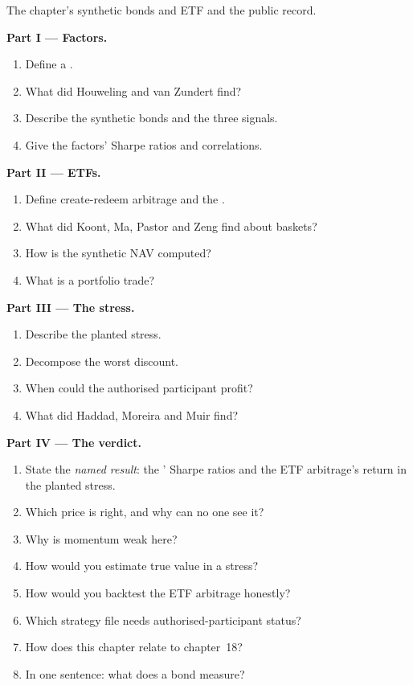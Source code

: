 \begin{problem}\label{pb:s2:systematic-credit-and-bond-etf-arbitrage:1}
The chapter's synthetic bonds and ETF and the public record.

\medskip\noindent\textbf{Part I --- Factors.}
\begin{enumerate}
\item Define a .
\item What did Houweling and van Zundert find?
\item Describe the synthetic bonds and the three signals.
\item Give the factors' Sharpe ratios and correlations.
\end{enumerate}

\medskip\noindent\textbf{Part II --- ETFs.}
\begin{enumerate}[resume]
\item Define create-redeem arbitrage and the .
\item What did Koont, Ma, Pastor and Zeng find about baskets?
\item How is the synthetic NAV computed?
\item What is a portfolio trade?
\end{enumerate}

\medskip\noindent\textbf{Part III --- The stress.}
\begin{enumerate}[resume]
\item Describe the planted stress.
\item Decompose the worst discount.
\item When could the authorised participant profit?
\item What did Haddad, Moreira and Muir find?
\end{enumerate}

\medskip\noindent\textbf{Part IV --- The verdict.}
\begin{enumerate}[resume]
\item State the \emph{named result}: the ' Sharpe ratios and the ETF arbitrage's return in the planted stress.
\item Which price is right, and why can no one see it?
\item Why is momentum weak here?
\item How would you estimate true value in a stress?
\item How would you backtest the ETF arbitrage honestly?
\item Which strategy file needs authorised-participant status?
\item How does this chapter relate to chapter~18?
\item In one sentence: what does a bond  measure?
\end{enumerate}
\end{problem}

